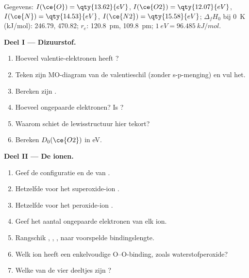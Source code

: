 \begin{problem}
\label{pb:b2:diatomic-mos:1}
Gegevens: $I(\ce{O}) = \qty{13.62}{eV}$, $I(\ce{O2}) = \qty{12.07}{eV}$, $I(\ce{N}) =
\qty{14.53}{eV}$, $I(\ce{N2}) = \qty{15.58}{eV}$; $\Delta_f H_0$ bij \qty{0}{K}
(\unit{kJ/mol}):  246.79,  470.82; $r_e$:  \qty{120.8}{pm}, 
\qty{109.8}{pm}; $1\ \unit{eV} = \qty{96.485}{kJ/mol}$.

\medskip
\noindent\textbf{Deel I --- Dizuurstof.}
\begin{enumerate}
  \item Hoeveel valentie-elektronen heeft ?
  \item Teken zijn MO-diagram van de valentieschil (zonder s-p-menging) en vul het.
  \item Bereken zijn .
  \item Hoeveel ongepaarde elektronen? Is  ?
  \item Waarom schiet de lewisstructuur hier tekort?
  \item Bereken $D_0(\ce{O2})$ in \unit{eV}.
\end{enumerate}

\medskip
\noindent\textbf{Deel II --- De ionen.}
\begin{enumerate}[resume]
  \item Geef de configuratie en de  van .
  \item Hetzelfde voor het superoxide-ion .
  \item Hetzelfde voor het peroxide-ion .
  \item Geef het aantal ongepaarde elektronen van elk ion.
  \item Rangschik , , ,  naar voorspelde bindingslengte.
  \item Welk ion heeft een enkelvoudige O--O-binding, zoals waterstofperoxide?
  \item Welke van de vier deeltjes zijn ?
\end{enumerate}


\end{problem}
